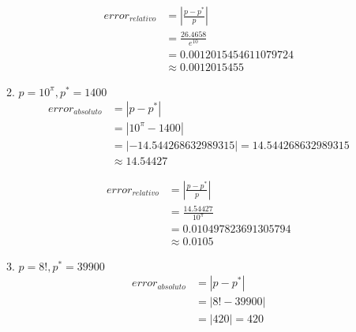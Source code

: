 \documentclass[12pt]{article}
\begin{document}
\begin{enumerate}
\begin{enumerate}[label=\alph*.]
            \[
            \begin{aligned}
                error_{relativo} &= \left| \frac{p - p^{*}}{p}\right| \\
                                 &= \frac{26.4658}{e^{10}} \\
                                 &= 0.0012015454611079724\\
                                 &\approx 0.0012015455
            \end{aligned}
        \]
        \item \(p = 10^{\pi}, p^{*} = 1400\)
        \[
            \begin{aligned}
                error_{absoluto} &= \left| p - p^{*}\right| \\
                                 &= \left| 10^{\pi} - 1400 \right| \\
                                 &= \left|-14.544268632989315\right| = 14.544268632989315 \\
                                 &\approx 14.54427
            \end{aligned}
            \]
    
            \[
            \begin{aligned}
                error_{relativo} &= \left| \frac{p - p^{*}}{p}\right| \\
                                 &= \frac{14.54427}{10^{\pi}} \\
                                 &= 0.010497823691305794\\
                                 &\approx 0.0105
            \end{aligned}
        \]
        \item \(p = 8!, p^{*} = 39900\)
        \[
            \begin{aligned}
                error_{absoluto} &= \left| p - p^{*}\right| \\
                                 &= \left| 8! - 39900 \right| \\
                                 &= \left|420\right| = 420
            \end{aligned}
            \]
    

\end{enumerate}
\end{enumerate}
\end{document}

